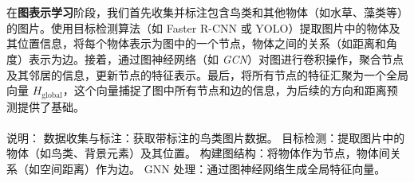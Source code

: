 \section{}
在\textbf{图表示学习}阶段，我们首先收集并标注包含鸟类和其他物体（如水草、藻类等）的图片。使用目标检测算法（如 Faster R-CNN 或 YOLO）提取图片中的物体及其位置信息，将每个物体表示为图中的一个节点，物体之间的关系（如距离和角度）表示为边。接着，通过图神经网络（如 \textit{GCN}）对图进行卷积操作，聚合节点及其邻居的信息，更新节点的特征表示。最后，将所有节点的特征汇聚为一个全局向量 \( H_{\text{global}} \)，这个向量捕捉了图中所有节点和边的信息，为后续的方向和距离预测提供了基础。

\begin{figure}[h!]
\centering %
\end{figure}

\paragraph{}
说明：
数据收集与标注：获取带标注的鸟类图片数据。
目标检测：提取图片中的物体（如鸟类、背景元素）及其位置。
构建图结构：将物体作为节点，物体间关系（如空间距离）作为边。
GNN 处理：通过图神经网络生成全局特征向量。